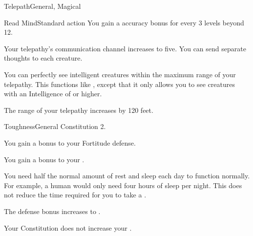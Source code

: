 \begin{magicalfeat}{Telepath}{General, Magical}
\begin{magicalsustainability}{Read Mind}{Standard action}
      \rankline
      You gain a  accuracy bonus for every 3 levels beyond 12.
    \end{magicalsustainability}

     Your telepathy's communication channel  increases to five.
    You can send separate thoughts to each creature.

     You can perfectly see intelligent creatures within the maximum range of your telepathy.
    This functions like , except that it only allows you to see creatures with an Intelligence of  or higher.

     The range of your telepathy increases by 120 feet.
  \end{magicalfeat}

  \begin{feat}{Toughness}{General}
    \featpre Constitution 2.

     You gain a  bonus to your Fortitude defense.

     You gain a  bonus to your .

     You need half the normal amount of rest and sleep each day to function normally.
    For example, a human would only need four hours of sleep per night.
    This does not reduce the time required for you to take a .

     The defense bonus increases to .

     Your Constitution does not increase your .
  \end{feat}

